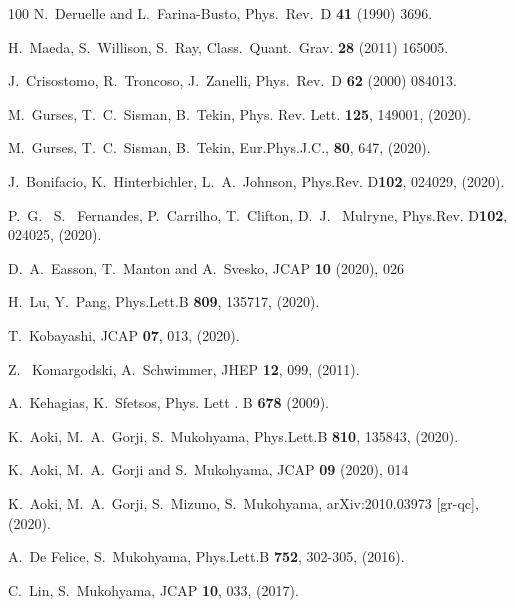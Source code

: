 \documentclass[aps,prd,preprint,nofootinbib]{revtex4-1}
\begin{document}
\begin{thebibliography}{100}
 N.~Deruelle and L.~Farina-Busto,
  Phys.\ Rev.\ D {\bf 41} (1990) 3696.

 H.~Maeda, S.~Willison, S.~Ray, 
    Class.\ Quant.\ Grav. {\bf 28} (2011) 165005.

 J.~Crisostomo, R.~Troncoso, J.~Zanelli, 
    Phys.\ Rev.\ D {\bf 62} (2000) 084013.

 M.~Gurses, T.~C.~Sisman, B.~Tekin,
Phys. Rev. Lett. {\bf 125}, 149001, (2020).

 M.~Gurses, T.~C.~Sisman, B.~Tekin,
Eur.Phys.J.C., {\bf 80}, 647, (2020).

 J.~Bonifacio, K.~Hinterbichler, L.~A.~Johnson,
 Phys.Rev. D{\bf 102}, 024029, (2020).

 P.~G.~ S.~ Fernandes, P.~Carrilho, T.~Clifton, D.~J.~ Mulryne,
 Phys.Rev. D{\bf 102}, 024025, (2020).

 D.~A.~Easson, T.~Manton and A.~Svesko,
JCAP \textbf{10} (2020), 026

 H.~Lu, Y.~Pang,
    Phys.Lett.B {\bf 809}, 135717, (2020).

 T.~Kobayashi,
    JCAP {\bf 07}, 013, (2020).

 Z.~ Komargodski, A.~Schwimmer,
  JHEP  {\bf 12}, 099, (2011).

 A.~Kehagias, K.~Sfetsos,  
    Phys. Lett . B {\bf 678} (2009).

 K.~Aoki, M.~A.~Gorji, S.~Mukohyama,
   Phys.Lett.B {\bf 810}, 135843, (2020).

 K.~Aoki, M.~A.~Gorji and S.~Mukohyama,
JCAP \textbf{09} (2020), 014

 K.~Aoki, M.~A.~Gorji, S.~Mizuno, S.~Mukohyama,
   	arXiv:2010.03973 [gr-qc], (2020).

 A.~De Felice, S.~Mukohyama,
	Phys.Lett.B {\bf 752}, 302-305, (2016).

 C.~Lin, S.~Mukohyama,
	JCAP {\bf 10}, 033, (2017).


\end{thebibliography}
\end{document}
